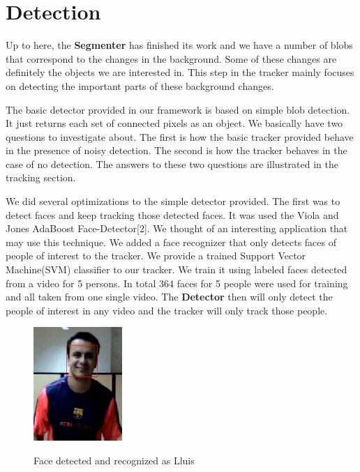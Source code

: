 \section{Detection}

Up to here, the \textbf{Segmenter} has finished its work and we have a number of blobs that correspond to the changes in the background. Some of these changes are definitely the objects we are interested in. This step in the tracker mainly focuses on detecting the important parts of these background changes.

The basic detector provided in our framework is based on simple blob detection. It just returns each set of connected pixels as an object. We basically have two questions to investigate about. The first is how the basic tracker provided behave in the presence of noisy detection. The second is how the tracker behaves in the case of no detection. The answers to these two questions are illustrated in the tracking section.

We did several optimizations to the simple detector provided. The first was to detect faces and keep tracking those detected faces. It was used the Viola and Jones AdaBoost Face-Detector[2]. We thought of an interesting application that may use this technique. We added a face recognizer that only detects faces of people of interest to the tracker. We provide a trained Support Vector Machine(SVM) classifier to our tracker. We train it using labeled faces detected from a video for 5 persons. In total 364 faces for 5 people were used for training and all taken from one single video. The \textbf{Detector} then will only detect the people of interest in any video and the tracker will only track those people.

\begin{figure}[Face detection and recognition]{\includegraphics[width=0.3\textwidth]{det_lluis}}
  \centering
  \caption{Face detected and recognized as Lluis}
\end{figure}

